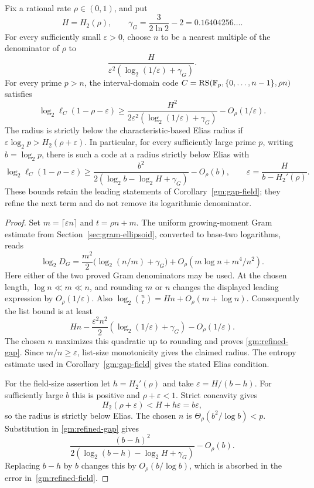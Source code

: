 \begin{corollary}
\label{gm:refined-gap-field}
Fix a rational rate $\rho\in(0,1)$, and put
\[
 H=H_2(\rho),\qquad
 \gamma_G=\frac{3}{2\ln2}-2=0.16404256\ldots.
\]
For every sufficiently small $\varepsilon>0$, choose $n$ to be a
nearest multiple of the denominator of $\rho$ to
\[
 \frac{H}{\varepsilon^2(\log_2(1/\varepsilon)+\gamma_G)}.
\]
For every prime $p>n$, the interval-domain code
$C=\operatorname{RS}(\mathbb F_p,\{0,\ldots,n-1\},\rho n)$ satisfies
\begin{equation}\label{gm:refined-gap}
 \log_2\ell_C(1-\rho-\varepsilon)
 \ge \frac{H^2}{2\varepsilon^2
       (\log_2(1/\varepsilon)+\gamma_G)}
       -O_\rho(1/\varepsilon).
\end{equation}
The radius is strictly below the characteristic-based Elias radius
if $\varepsilon\log_2p>H_2(\rho+\varepsilon)$.
In particular, for every sufficiently large prime $p$, writing
$b=\log_2p$, there is such a code at a radius strictly below Elias with
\begin{equation}\label{gm:refined-field}
 \log_2\ell_C(1-\rho-\varepsilon)
 \ge \frac{b^2}{2(\log_2b-\log_2H+\gamma_G)}-O_\rho(b),
 \qquad
 \varepsilon=\frac{H}{b-H_2'(\rho)}.
\end{equation}
These bounds retain the leading statements of
Corollary~\ref{gm:gap-field}; they refine the next term and do not
remove its logarithmic denominator.
\end{corollary}
\begin{proof}
Set $m=\lceil\varepsilon n\rceil$ and $t=\rho n+m$.
The uniform growing-moment Gram estimate from
Section~\ref{sec:gram-ellipsoid}, converted to base-two logarithms,
reads
\[
 \log_2D_G=\frac{m^2}{2}
       \bigl(\log_2(n/m)+\gamma_G\bigr)
       +O_\rho(m\log n+m^4/n^2).
\]
Here either of the two proved Gram denominators may be used.
At the chosen length, $\log n\ll m\ll n$, and rounding $m$ or $n$
changes the displayed leading expression by $O_\rho(1/\varepsilon)$.
Also
$\log_2\binom nt=Hn+O_\rho(m+\log n)$.
Consequently the list bound is at least
\[
 Hn-\frac{\varepsilon^2n^2}{2}
       (\log_2(1/\varepsilon)+\gamma_G)
       -O_\rho(1/\varepsilon).
\]
The chosen $n$ maximizes this quadratic up to rounding and proves
\eqref{gm:refined-gap}. Since $m/n\ge\varepsilon$, list-size
monotonicity gives the claimed radius. The entropy estimate used in
Corollary~\ref{gm:gap-field} gives the stated Elias condition.

For the field-size assertion let $h=H_2'(\rho)$ and take
$\varepsilon=H/(b-h)$. For sufficiently large $b$ this is positive
and $\rho+\varepsilon<1$. Strict concavity gives
\[
 H_2(\rho+\varepsilon)<H+h\varepsilon
                         =b\varepsilon,
\]
so the radius is strictly below Elias. The chosen $n$ is
$\Theta_\rho(b^2/\log b)<p$. Substitution in
\eqref{gm:refined-gap} gives
\[
 \frac{(b-h)^2}
 {2(\log_2(b-h)-\log_2H+\gamma_G)}-O_\rho(b).
\]
Replacing $b-h$ by $b$ changes this by $O_\rho(b/\log b)$,
which is absorbed in the error in~\eqref{gm:refined-field}.
\end{proof}
